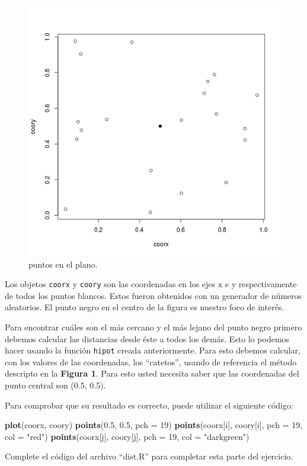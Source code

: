 \documentclass[]{article}
\makeatletter
\newenvironment{Shaded}{}{}
\newcommand{\KeywordTok}[1]{\textcolor[rgb]{0.00,0.44,0.13}{\textbf{{#1}}}}
\newcommand{\DataTypeTok}[1]{\textcolor[rgb]{0.56,0.13,0.00}{{#1}}}
\newcommand{\DecValTok}[1]{\textcolor[rgb]{0.25,0.63,0.44}{{#1}}}
\newcommand{\FloatTok}[1]{\textcolor[rgb]{0.25,0.63,0.44}{{#1}}}
\newcommand{\StringTok}[1]{\textcolor[rgb]{0.25,0.44,0.63}{{#1}}}
\newcommand{\NormalTok}[1]{{#1}}
\def\maxwidth{\ifdim\Gin@nat@width>\linewidth\linewidth
\else\Gin@nat@width\fi}
\let\Oldincludegraphics\includegraphics
\renewcommand{\includegraphics}[1]{\Oldincludegraphics[width=\maxwidth]{#1}}
\makeatother
\begin{document}
\begin{figure}[htbp]
\centering
\includegraphics{figure/unnamed-chunk-10.png}
\caption{puntos en el plano.}
\end{figure}

Los objetos \texttt{coorx} y \texttt{coory} son las coordenadas en los
ejes x e y respectivamente de todos los puntos blancos. Estos fueron
obtenidos con un generador de números aleatorios. El punto negro en el
centro de la figura es nuestro foco de interés.

Para encontrar cuáles son el más cercano y el más lejano del punto negro
primero debemos calcular las distancias desde éste a todos los demás.
Esto lo podemos hacer usando la función \texttt{hipot} creada
anteriormente. Para esto debemos calcular, con los valores de las
coordenadas, los ``catetos'', usando de referencia el método descripto
en la \textbf{Figura 1}. Para esto usted necesita saber que las
coordenadas del punto central son (0.5, 0.5).

Para comprobar que su resultado es correcto, puede utilizar el siguiente
código:

\begin{Shaded}
\begin{Highlighting}[]
\KeywordTok{plot}\NormalTok{(coorx, coory)}
\KeywordTok{points}\NormalTok{(}\FloatTok{0.5}\NormalTok{, }\FloatTok{0.5}\NormalTok{, }\DataTypeTok{pch =} \DecValTok{19}\NormalTok{)}
\KeywordTok{points}\NormalTok{(coorx[i], coory[i], }\DataTypeTok{pch =} \DecValTok{19}\NormalTok{, }\DataTypeTok{col =} \StringTok{"red"}\NormalTok{)}
\KeywordTok{points}\NormalTok{(coorx[j], coory[j], }\DataTypeTok{pch =} \DecValTok{19}\NormalTok{, }\DataTypeTok{col =} \StringTok{"darkgreen"}\NormalTok{)}
\end{Highlighting}
\end{Shaded}
Complete el código del archivo ``dist.R'' para completar esta parte del
ejercicio.
\end{document}
